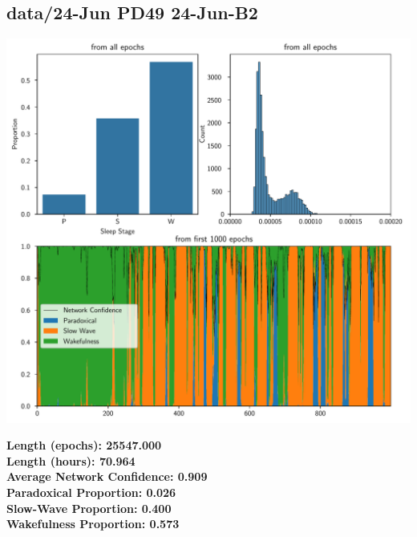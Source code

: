         \subsection*{ data/24-Jun PD49 24-Jun-B2 }
        \begin{center}
        \begin{adjustbox}{width=1\textwidth}
        \includegraphics[page=5]{figs.pdf}
        \end{adjustbox}
        \end{center}
        \large\textbf{Length (epochs): 25547.000}\\
        \textbf{Length (hours): 70.964}\\
        \textbf{Average Network Confidence: 0.909}\\
        \textbf{Paradoxical Proportion: 0.026}\\
        \textbf{Slow-Wave Proportion: 0.400}\\
        \textbf{Wakefulness Proportion: 0.573}\\
        
